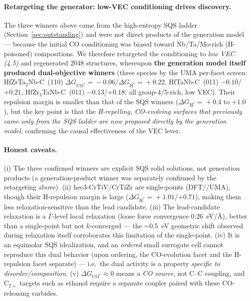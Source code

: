 \documentclass[11pt,a4paper]{report}
\newcommand{\dGCO}{\Delta G_{\mathrm{CO^*}}}
\newcommand{\dGH}{\Delta G_{\mathrm{H^*}}}
\begin{document}
\paragraph{Retargeting the generator: low-VEC conditioning drives discovery.} The three winners above came from the high-entropy SQS
ladder (Section~\ref{sec:outstanding}) and were not direct products of the generation model --- because the initial CO conditioning was biased toward
Nb/Ta/Mo-rich (H-poisoned) compositions. We therefore retargeted the conditioning to \emph{low VEC (4.5)} and
regenerated 2048 structures, whereupon \textbf{the generation model itself produced dual-objective winners} (three species by the UMA per-facet screen:
HfZrTa$_2$Nb-C~(110) $\dGCO\!=\!-0.06$/$\dGH\!=\!+0.22$, HfTaNb-C~(011) $-0.10$/$+0.21$,
HfZr$_3$TaNb-C~(011) $-0.13$/$+0.18$; all group-4/5-rich, low VEC). Their repulsion margin is
smaller than that of the SQS winners ($\dGH\!=\!+0.4$ to $+1.0$), but the key point is that the \emph{H-repelling, CO-evolving surfaces that previously
came only from the SQS ladder are now proposed directly by the generation model}, confirming the causal effectiveness of the VEC lever.

\paragraph{Honest caveats.} (i) The three confirmed winners are explicit SQS solid solutions, not generation products (a generation-product winner was
separately confirmed by the retargeting above). (ii) hec3-CrTiV/CrTiZr are single-points (DFT$/\!/$UMA), though their H-repulsion margin
is large ($\dGH\!=\!+1.01$/$+0.71$), making them less relaxation-sensitive than the lead candidate. (iii) The lead-candidate relaxation is a $\Gamma$-level
local relaxation (loose force convergence 0.26~eV/\AA), better than a single-point but not $k$-converged --- the $\sim$0.5~eV geometric shift
observed during relaxation itself corroborates this limitation of the single-point. (iv) It is an equimolar SQS idealization, and an \emph{ordered}
small surrogate cell cannot reproduce this dual behavior (upon ordering, the CO-evolution facet and the H-repulsion facet separate) --- i.e.\ the dual
activity is a property \emph{specific to disorder/composition}. (v) $\dGCO\!\approx\!0$ means a \emph{CO source}, not C--C coupling, and
C$_{2+}$ targets such as ethanol require a separate coupler paired with these CO-releasing carbides.

\end{document}
